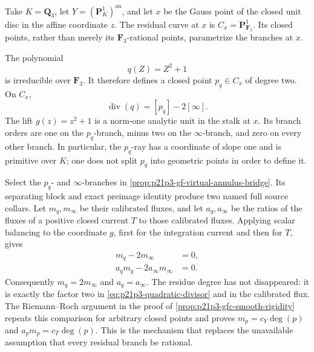 \begin{example}
\label{ex:p21p3-higher-degree-residual-branch}
Take \(K=\mathbf Q_3\), let \(Y=(\mathbf P^1_K)^{\mathrm{an}}\), and let
\(x\) be the Gauss point of the closed unit disc in the affine coordinate
\(z\).  The residual curve at \(x\) is
\(C_x=\mathbf P^1_{\mathbf F_3}\).  Its closed points, rather than merely
its \(\mathbf F_3\)-rational points, parametrize the branches at \(x\).

The polynomial
\[
                              q(Z)=Z^2+1
\]
is irreducible over \(\mathbf F_3\).  It therefore defines a closed point
\(p_q\in C_x\) of degree two.  On \(C_x\),
\begin{equation}
                    \operatorname{div}(q)=[p_q]-2[\infty].
 \label{eq:p21p3-quadratic-divisor}
\end{equation}
The lift \(g(z)=z^2+1\) is a norm-one analytic unit in the stalk at \(x\).
Its branch orders are one on the \(p_q\)-branch, minus two on the
\(\infty\)-branch, and zero on every other branch.  In particular, the
\(p_q\)-ray has a coordinate of slope one and is primitive over \(K\); one
does not split \(p_q\) into geometric points in order to define it.

Select the \(p_q\)- and \(\infty\)-branches in
\cref{prop:p21p3-gf-virtual-annulus-bridge}.  Its separating block and exact
preimage identity produce two named full source collars.  Let
\(m_q,m_\infty\) be their calibrated fluxes, and let
\(a_q,a_\infty\) be the ratios of the fluxes of a positive closed current
\(T\) to those calibrated fluxes.  Applying scalar balancing to the
coordinate \(g\), first for the integration current and then for \(T\),
gives
\begin{align}
                   m_q-2m_\infty&=0,
 \label{eq:p21p3-quadratic-calibrated-balance}\\
             a_qm_q-2a_\infty m_\infty&=0.
 \label{eq:p21p3-quadratic-current-balance}
\end{align}
Consequently \(m_q=2m_\infty\) and \(a_q=a_\infty\).  The residue degree
has not disappeared: it is exactly the factor two in
\eqref{eq:p21p3-quadratic-divisor} and in the calibrated flux.  The
Riemann--Roch argument in the proof of
\cref{prop:p21p3-gfc-smooth-rigidity} repeats this comparison for arbitrary
closed points and proves \(m_p=c_Y\deg(p)\) and
\(a_pm_p=c_T\deg(p)\).  This is the mechanism that replaces the unavailable
assumption that every residual branch be rational.
\end{example}
